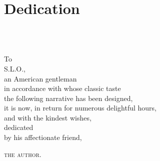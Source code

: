 \documentclass[
a5paper,
]{scrbook} %
\begin{document}
\frontmatter
\pagestyle{empty}

 
 
 
 
 
 



\pagestyle{plain}



\tableofcontents

\cleardoubleevenpage

\listoffigures


\chapter*{Dedication}
~\\
~\\
\begin{center}\large
To\\
S.L.O.,\\ 
an American gentleman\\ 
in accordance with whose classic taste\\ 
the following narrative has been designed,\\ 
it is now, in return for numerous delightful hours,\\ 
and with the kindest wishes,\\
dedicated\\
 by his affectionate friend,\\
\begin{flushright}\scshape
the author.
\end{flushright}
\end{center}
\clearpage
\end{document}

